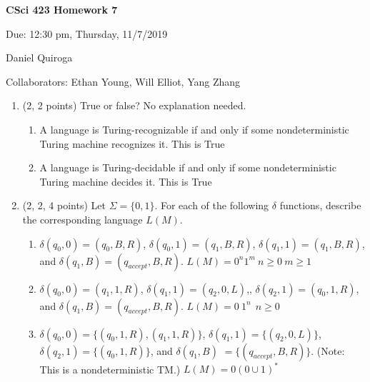 \documentclass[11pt]{article}
\begin{document}
\begin{LARGE}
\centerline {\bf CSci 423 Homework 7}
\end{LARGE}
\vskip 0.25cm

\centerline{Due: 12:30 pm, Thursday, 11/7/2019}
\centerline{Daniel Quiroga}

Collaborators: Ethan Young, Will Elliot, Yang Zhang

\begin{enumerate}

\item (2, 2 points) True or false? No explanation needed.
\begin{enumerate}
\item A language is Turing-recognizable if and only if some nondeterministic Turing machine recognizes it.\newline
This is True
\item A language is Turing-decidable if and only if some nondeterministic Turing machine decides it.\newline
This is True
\end{enumerate}

\item (2, 2, 4 points)  Let $\Sigma=\{0,1\}$.
For each of the following $\delta$ functions, describe the corresponding language $L(M)$.
\begin{enumerate}
\item $\delta(q_0,0)=(q_0,B,R)$, $\delta(q_0,1)=(q_1,B,R)$, $\delta(q_1,1)=(q_1,B,R)$,
and $\delta(q_1,B)=(q_{accept},B,R)$. \newline 
$L(M) = 0^n 1^m\ n\ge 0 \  m \ge 1$ 

\item $\delta(q_0,0)=(q_1,1,R)$, $\delta(q_1,1)=(q_2,0,L)$,, $\delta(q_2,1)=(q_0,1,R)$,
and $\delta(q_1,B)=(q_{accept},B,R)$.\newline 
$L(M) =0 \ 1^n \ \ n\ge 0$

\item $\delta(q_0,0)=\{(q_0,1,R),(q_1,1,R)\}$, $\delta(q_1,1)=\{(q_2,0,L)\}$, 
$\delta(q_2,1)=\{(q_0,1,R)\}$, and $\delta(q_1,B)$ $=\{(q_{accept},B,R)\}$. 
(Note: This is a nondeterministic TM.) \newline 
$L(M) = 0(0\cup 1)^*$


\end{enumerate}


\end{enumerate}
\end{document}
